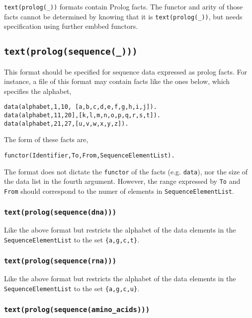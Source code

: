 \documentclass{book}
\begin{document}
\texttt{text(prolog(\_))} formats contain Prolog facts. The functor and
arity of those facts cannot be determined by knowing that it is
\texttt{text(prolog(\_))}, but needs specification using further embbed
functors.

\subsection{\texttt{text(prolog(sequence(\_)))}}

This format should be specified for sequence data expressed as prolog
facts. For instance, a file of this format may contain facts like the
ones below, which specifies the alphabet, 
\begin{verbatim}
data(alphabet,1,10, [a,b,c,d,e,f,g,h,i,j]).
data(alphabet,11,20],[k,l,m,n,o,p,q,r,s,t]).
data(alphabet,21,27,[u,v,w,x,y,z]).
\end{verbatim}

\noindent
The form of these facts are, 
\begin{verbatim}
functor(Identifier,To,From,SequenceElementList).
\end{verbatim}

\noindent
The format does not dictate the \texttt{functor} of the facts
(e.g. \texttt{data}), nor the size of the data list in the fourth
argument. However, the range expressed by \texttt{To} and
\texttt{From} should correspond to the numer of elements
in \texttt{SequenceElementList}.

\subsubsection{\texttt{text(prolog(sequence(dna)))}}

Like the above format but restricts the alphabet of the data elements
in the \texttt{SequenceElementList} to the set \texttt{\{a,g,c,t\}}.

\subsubsection{\texttt{text(prolog(sequence(rna)))}}

Like the above format but restricts the alphabet of the data elements
in the \texttt{SequenceElementList} to the set \texttt{\{a,g,c,u\}}.

\subsubsection{\texttt{text(prolog(sequence(amino\_acids)))}}
\end{document}
